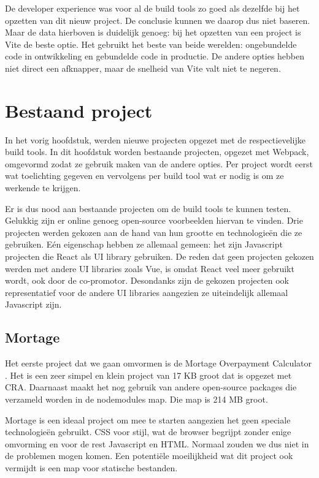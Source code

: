 De developer experience was voor al de build tools zo goed als dezelfde bij het opzetten van dit nieuw project. De conclusie kunnen we daarop dus niet baseren. Maar de data hierboven is duidelijk genoeg: bij het opzetten van een project is Vite de beste optie. Het gebruikt het beste van beide werelden: ongebundelde code in ontwikkeling en gebundelde code in productie. De andere opties hebben niet direct een afknapper, maar de snelheid van Vite valt niet te negeren.

\chapter{Bestaand project}

In het vorig hoofdstuk, werden nieuwe projecten opgezet met de respectievelijke build tools. In dit hoofdstuk worden bestaande projecten, opgezet met Webpack, omgevormd zodat ze gebruik maken van de andere opties. Per project wordt eerst wat toelichting gegeven en vervolgens per build tool wat er nodig is om ze werkende te krijgen.

Er is dus nood aan bestaande projecten om de build tools te kunnen testen. Gelukkig zijn er online genoeg open-source voorbeelden hiervan te vinden. Drie projecten werden gekozen aan de hand van hun grootte en technologieën die ze gebruiken. Eén eigenschap hebben ze allemaal gemeen: het zijn Javascript projecten die React als UI library gebruiken. De reden dat geen projecten gekozen werden met andere UI libraries zoals Vue, is omdat React veel meer gebruikt wordt, ook door de co-promotor. Desondanks zijn de gekozen projecten ook representatief voor de andere UI libraries aangezien ze uiteindelijk allemaal Javascript zijn.

\section{Mortage}
Het eerste project dat we gaan omvormen is de Mortage Overpayment Calculator \autocite{houghton-2019}.
Het is een zeer simpel en klein project van 17 KB groot dat is opgezet met CRA.
Daarnaast maakt het nog gebruik van andere open-source packages die verzameld worden in de nodemodules map.
Die map is 214 MB groot.

Mortage is een ideaal project om mee te starten aangezien het geen speciale technologieën gebruikt. CSS voor stijl, wat de browser begrijpt zonder enige omvorming en voor de rest Javascript en HTML. Normaal zouden we dus niet in de problemen mogen komen. Een potentiële moeilijkheid wat dit project ook vermijdt is een map voor statische bestanden.

